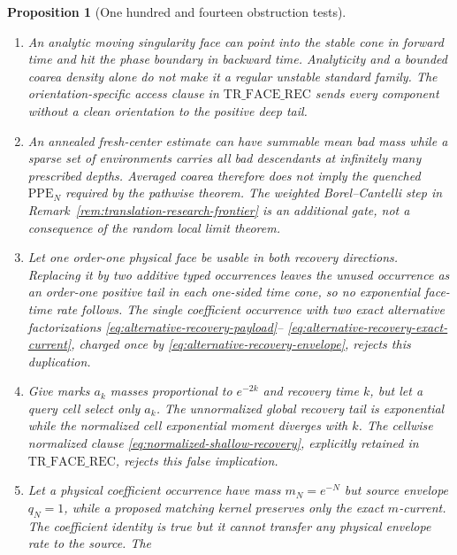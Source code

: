 \documentclass[11pt]{article}
\newtheorem{proposition}[theorem]{Proposition}
\begin{document}
\begin{proposition}[One hundred and fourteen obstruction tests]
\begin{enumerate}[label=\textup{(T\arabic*)}]
      truncated function can have a good $r$-sublevel estimate while the
      actual slope is shifted across the entire window.  The same-scale
      remainder bound
      \eqref{eq:translation-finite-holonomy-truncation} rejects this
      substitution of analytic finite words for the actual slope.
\item An analytic moving singularity face can point into the stable cone in
      forward time and hit the phase boundary in backward time.  Analyticity
      and a bounded coarea density alone do not make it a regular unstable
      standard family.  The orientation-specific access clause in
      $\mathrm{TR\_FACE\_REC}$ sends every component without a clean
      orientation to the positive deep tail.
\item An annealed fresh-center estimate can have summable mean bad mass while
      a sparse set of environments carries all bad descendants at infinitely
      many prescribed depths.  Averaged coarea therefore does not imply the
      quenched $\mathrm{PPE}_{N}$ required by the pathwise theorem.  The
      weighted Borel--Cantelli step in
      Remark~\ref{rem:translation-research-frontier} is an additional gate,
      not a consequence of the random local limit theorem.
\item Let one order-one physical face be usable in both recovery directions.
      Replacing it by two additive typed occurrences leaves the unused
      occurrence as an order-one positive tail in each one-sided time cone,
      so no exponential face-time rate follows.  The single coefficient
      occurrence with two exact alternative factorizations
      \eqref{eq:alternative-recovery-payload}--
      \eqref{eq:alternative-recovery-exact-current}, charged once by
      \eqref{eq:alternative-recovery-envelope}, rejects this duplication.
\item Give marks $a_k$ masses proportional to $e^{-2k}$ and recovery time
      $k$, but let a query cell select only $a_k$.  The unnormalized global
      recovery tail is exponential while the normalized cell exponential
      moment diverges with $k$.  The cellwise normalized clause
      \eqref{eq:normalized-shallow-recovery}, explicitly retained in
      $\mathrm{TR\_FACE\_REC}$, rejects this false implication.
\item Let a physical coefficient occurrence have mass $m_N=e^{-N}$ but
      source envelope $q_N=1$, while a proposed matching kernel preserves
      only the exact $m$-current.  The coefficient identity is true but it
      cannot transfer any physical envelope rate to the source.  The

\end{enumerate}
\end{proposition}
\end{document}
